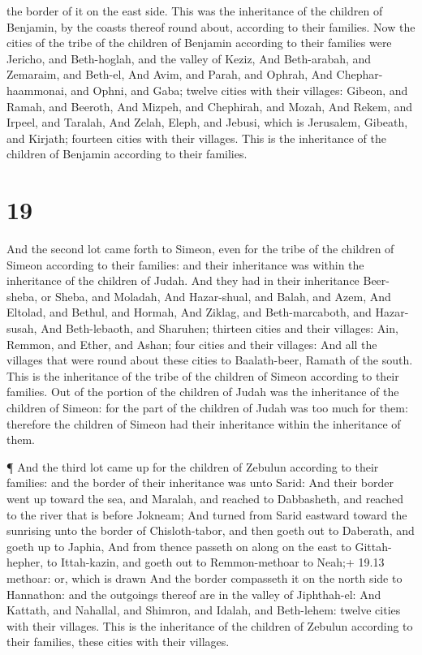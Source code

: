the border of it on the east side. This was the inheritance of the
children of Benjamin, by the coasts thereof round about, according to
their families.  Now the cities of the tribe of the
children of Benjamin according to their families were Jericho, and
Beth-hoglah, and the valley of Keziz,  And Beth-arabah, and
Zemaraim, and Beth-el,  And Avim, and Parah, and Ophrah,
 And Chephar-haammonai, and Ophni, and Gaba; twelve cities
with their villages:  Gibeon, and Ramah, and Beeroth,
 And Mizpeh, and Chephirah, and Mozah,  And
Rekem, and Irpeel, and Taralah,  And Zelah, Eleph, and
Jebusi, which is Jerusalem, Gibeath, and Kirjath; fourteen cities with
their villages. This is the inheritance of the children of Benjamin
according to their families.

\hypertarget{section-18}{%
\section{19}\label{section-18}}

 And the second lot came forth to Simeon, even for the tribe
of the children of Simeon according to their families: and their
inheritance was within the inheritance of the children of Judah.
 And they had in their inheritance Beer-sheba, or Sheba, and
Moladah,  And Hazar-shual, and Balah, and Azem, 
And Eltolad, and Bethul, and Hormah,  And Ziklag, and
Beth-marcaboth, and Hazar-susah,  And Beth-lebaoth, and
Sharuhen; thirteen cities and their villages:  Ain, Remmon,
and Ether, and Ashan; four cities and their villages:  And
all the villages that were round about these cities to Baalath-beer,
Ramath of the south. This is the inheritance of the tribe of the
children of Simeon according to their families.  Out of the
portion of the children of Judah was the inheritance of the children of
Simeon: for the part of the children of Judah was too much for them:
therefore the children of Simeon had their inheritance within the
inheritance of them.

 ¶ And the third lot came up for the children of Zebulun
according to their families: and the border of their inheritance was
unto Sarid:  And their border went up toward the sea, and
Maralah, and reached to Dabbasheth, and reached to the river that is
before Jokneam;  And turned from Sarid eastward toward the
sunrising unto the border of Chisloth-tabor, and then goeth out to
Daberath, and goeth up to Japhia,  And from thence passeth
on along on the east to Gittah-hepher, to Ittah-kazin, and goeth out to
Remmon-methoar to Neah;+ 19.13 methoar: or, which is drawn 
And the border compasseth it on the north side to Hannathon: and the
outgoings thereof are in the valley of Jiphthah-el:  And
Kattath, and Nahallal, and Shimron, and Idalah, and Beth-lehem: twelve
cities with their villages.  This is the inheritance of the
children of Zebulun according to their families, these cities with their
villages.


